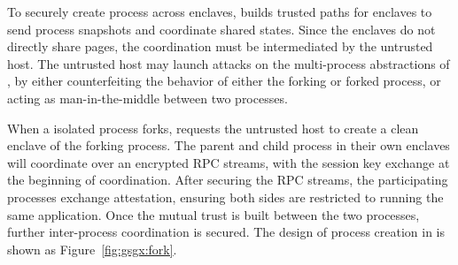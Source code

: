 To securely create process across enclaves,
\sysname{} builds trusted paths for enclaves to send process snapshots and coordinate shared states.
Since the enclaves do not directly share pages,
the coordination must be intermediated by the untrusted host.
The untrusted host may launch attacks on the multi-process abstractions of \sysname{},
by either counterfeiting the behavior of either the forking or forked process,
or acting as man-in-the-middle between two processes.


When a isolated process forks,
\sysname{} requests the untrusted host to create a clean enclave
of the forking process.
The parent and child process in their own enclaves
will coordinate over an encrypted RPC streams,
with the session key exchange at the beginning of coordination.
After securing the RPC streams,
the participating processes exchange attestation,
ensuring both sides are restricted to running the same application.
Once the mutual trust is built between the two processes,
further inter-process coordination is secured.
The design of process creation in \sysname{} is shown as Figure~\ref{fig:gsgx:fork}.

%
%
%
%
%
%

